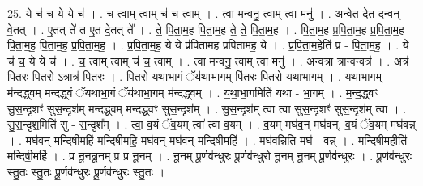 \documentclass[17pt]{extarticle}
\begin{document}
25. ये च॑ च॒ ये ये च॑ । . च॒ त्वाम् त्वाम् च॑ च॒ त्वाम् । . त्वा मन्वनु॒ त्वाम् त्वा मनु॑ । . अन्वे॒त दे॒त दन्वन् वे॒तत् । . ए॒तत् ते॑ त ए॒त दे॒तत् ते᳚ । . ते॒ पि॒ता॒म॒ह॒ पि॒ता॒म॒ह॒ ते॒ ते॒ पि॒ता॒म॒ह॒ । . पि॒ता॒म॒ह॒ प्र॒पि॒ता॒म॒ह॒ प्र॒पि॒ता॒म॒ह॒ पि॒ता॒म॒ह॒ पि॒ता॒म॒ह॒ प्र॒पि॒ता॒म॒ह॒ । . प्र॒पि॒ता॒म॒ह॒ ये ये प्र॑पितामह प्रपितामह॒ ये । . प्र॒पि॒ता॒म॒हेति॑ प्र - पि॒ता॒म॒ह॒ । . ये च॑ च॒ ये ये च॑ । . च॒ त्वाम् त्वाम् च॑ च॒ त्वाम् । . त्वा मन्वनु॒ त्वाम् त्वा मनु॑ । . अन्वत्रा त्रान्वन्वत्र॑ । . अत्र॑ पितरः पित॒रो ऽत्रात्र॑ पितरः । . पि॒त॒रो॒ य॒था॒भा॒गं ॅय॑थाभा॒गम् पि॑तरः पितरो यथाभा॒गम् । . य॒था॒भा॒गम् म॑न्दद्ध्वम् मन्दद्ध्वं ॅयथाभा॒गं ॅय॑थाभा॒गम् म॑न्दद्ध्वम् । . य॒था॒भा॒गमिति॑ यथा - भा॒गम् । . म॒न्द॒द्ध्वꣳ॒॒ सु॒स॒न्दृशꣳ॑ सुस॒न्दृश॑म् मन्दद्ध्वम् मन्दद्ध्वꣳ सुस॒न्दृश᳚म् । . सु॒स॒न्दृश॑म् त्वा त्वा सुस॒न्दृशꣳ॑ सुस॒न्दृश॑म् त्वा । . सु॒स॒न्दृश॒मिति॑ सु - स॒न्दृश᳚म् । . त्वा॒ व॒यं ॅव॒यम् त्वा᳚ त्वा व॒यम् । . व॒यम् मघ॑व॒न् मघ॑वन्. व॒यं ॅव॒यम् मघ॑वन्न् । . मघ॑वन् मन्दिषी॒महि॑ मन्दिषी॒महि॒ मघ॑व॒न् मघ॑वन् मन्दिषी॒महि॑ । . मघ॑व॒न्निति॒ मघ॑ - व॒न्न् । . म॒न्दि॒षी॒महीति॑ मन्दिषी॒महि॑ । . प्र नू॒नन्नू॒नम् प्र प्र नू॒नम् । . नू॒नम् पू॒र्णव॑न्धुरः पू॒र्णव॑न्धुरो नू॒नम् नू॒नम् पू॒र्णव॑न्धुरः । . पू॒र्णव॑न्धुरः स्तु॒तः स्तु॒तः पू॒र्णव॑न्धुरः पू॒र्णव॑न्धुरः स्तु॒तः । \newline
\end{document}
